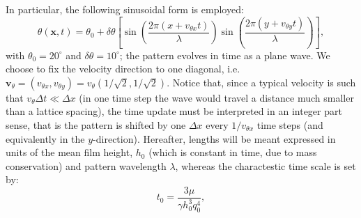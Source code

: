 \documentclass[twocolumn,amsmath,amssymb,showpacs,pre,nofootinbib,superscriptaddress]{revtex4-1} %
\begin{document}
In particular, the following sinusoidal form is employed:
\begin{equation}\label{eq:sinetheta}
    \theta(\mathbf{x},t) = \theta_0 + \delta\theta\left[\sin\left(\frac{2\pi (x+v_{\theta x}t)}{\lambda}\right)\sin\left(\frac{2\pi (y+v_{\theta y}t)}{\lambda}\right)\right], 
\end{equation}
with $\theta_0 = 20^{\circ}$ and $\delta\theta=10^{\circ}$; the pattern evolves in time as a plane wave.
We choose to fix the velocity direction to one diagonal, i.e.
$\mathbf{v}_{\theta} = (v_{\theta x},v_{\theta y}) = v_{\theta}(1/\sqrt{2},1/\sqrt{2})$.
Notice that, since a typical velocity is such that $v_{\theta} \Delta t \ll \Delta x$ (in one time step the wave would travel
a distance much smaller than a lattice spacing), the time update must be interpreted in an integer part sense, that is
the pattern is shifted by one $\Delta x$ every $1/v_{\theta x}$ time steps (and equivalently in the $y$-direction).
Hereafter, lengths will be meant expressed in units of the
mean film height, $h_0$ (which is constant in time, due to mass conservation) and pattern wavelength $\lambda$, whereas the charactestic
time scale is set by:
\begin{equation}\label{eq:t0}
t_0 = \frac{3\mu}{\gamma h_0^3 q_0^4},
\end{equation}
\end{document}
